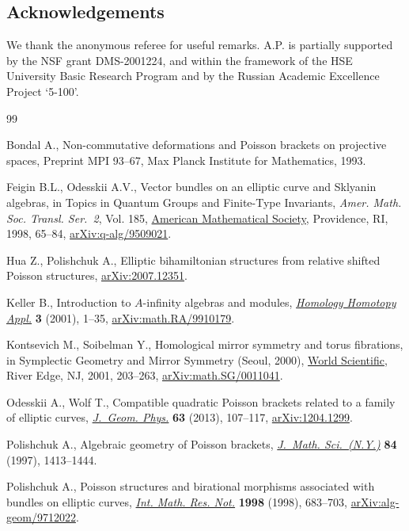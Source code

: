 \documentclass[pdftex]{sigma}
\numberwithin{equation}{section}
\begin{document}
\subsection*{Acknowledgements}

We thank the anonymous referee for useful remarks.
A.P. is partially supported by the NSF grant DMS-2001224,
and within the framework of the HSE University Basic Research Program and by the Russian Academic Excellence Project `5-100'.

\begin{thebibliography}{99}
\footnotesize\itemsep=0pt

Bondal A., Non-commutative deformations and {P}oisson brackets on projective
 spaces, {P}reprint MPI 93--67, Max Planck Institute for Mathematics, 1993.

Feigin B.L., Odesskii A.V., Vector bundles on an elliptic curve and {S}klyanin
 algebras, in Topics in Quantum Groups and Finite-Type Invariants,
 \textit{Amer. Math. Soc. Transl. Ser.~2}, Vol. 185, \href{https://doi.org/10.1090/trans2/185/04}{American Mathematical
 Society}, Providence, RI, 1998, 65--84, \href{https://arxiv.org/abs/arXiv:q-alg/9509021}{arXiv:q-alg/9509021}.

Hua Z., Polishchuk A., Elliptic bihamiltonian structures from relative shifted {P}oisson structures, \href{https://arxiv.org/abs/2007.12351}{arXiv:2007.12351}.

Keller B., Introduction to {$A$}-infinity algebras and modules,
 \href{https://doi.org/10.4310/hha.2001.v3.n1.a1}{\textit{Homology Homotopy Appl.}} \textbf{3} (2001), 1--35,
 \href{https://arxiv.org/abs/math.RA/9910179}{arXiv:math.RA/9910179}.

Kontsevich M., Soibelman Y., Homological mirror symmetry and torus fibrations,
 in Symplectic Geo\-met\-ry and Mirror Symmetry ({S}eoul, 2000), \href{https://doi.org/10.1142/9789812799821_0007}{World Scientific},
 River Edge, NJ, 2001, 203--263, \href{https://arxiv.org/abs/math.SG/0011041}{arXiv:math.SG/0011041}.

Odesskii A., Wolf T., Compatible quadratic {P}oisson brackets related to a
 family of elliptic curves, \href{https://doi.org/10.1016/j.geomphys.2012.10.004}{\textit{J.~Geom. Phys.}} \textbf{63} (2013),
 107--117, \href{https://arxiv.org/abs/1204.1299}{arXiv:1204.1299}.

Polishchuk A., Algebraic geometry of {P}oisson brackets, \href{https://doi.org/10.1007/BF02399197}{\textit{J.~Math.
 Sci.~(N.Y.)}} \textbf{84} (1997), 1413--1444.

Polishchuk A., Poisson structures and birational morphisms associated with
 bundles on elliptic curves, \href{https://doi.org/10.1155/S1073792898000415}{\textit{Int. Math. Res. Not.}} \textbf{1998}
 (1998), 683--703, \href{https://arxiv.org/abs/alg-geom/9712022}{arXiv:alg-geom/9712022}.

\end{thebibliography}\LastPageEnding
\end{document}
